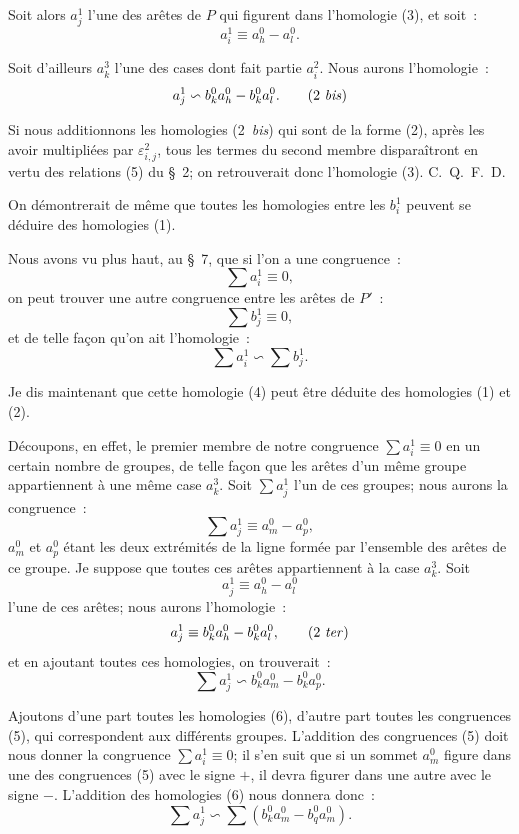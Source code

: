 \documentclass{article}
\begin{document}
Soit alors $a^{1}_{j}$ l'une des arêtes de $P$ qui figurent dans l'homologie (3), et soit~:
\[ a^{1}_{i} \equiv a^{0}_{h} - a^{0}_{l}. \]

Soit d'ailleurs $a^{3}_{k}$ l'une des cases dont fait partie $a^{2}_{i}$. Nous aurons l'homologie~:
\[ a^{1}_{j} \backsim b^{0}_{k} a^{0}_{h} - b^{0}_{k} a^{0}_{l}. \tag{2 \textit{bis}} \]

Si nous additionnons les homologies (2~\emph{bis}) qui sont de la forme (2), après les avoir multipliées par $\varepsilon^{2}_{i,j}$, tous les termes du second membre disparaîtront en vertu des relations (5) du \S~2; on retrouverait donc l'homologie (3). C.~Q.~F.~D.

On démontrerait de même que toutes les homologies entre les $b^{1}_{i}$ peuvent se déduire des homologies (1).

Nous avons vu plus haut, au \S~7, que si l'on a une congruence~:
\[ \sum a^{1}_{i} \equiv 0, \]
on peut trouver une autre congruence entre les arêtes de $P'$~:
\[ \sum b^{1}_{j} \equiv 0, \]
et de telle façon qu'on ait l'homologie~:
\[ \sum a^{1}_{i} \backsim \sum b^{1}_{j}. \tag{4} \]

Je dis maintenant que cette homologie (4) peut être déduite des homologies (1) et (2).

Découpons, en effet, le premier membre de notre congruence $\displaystyle\sum a^{1}_{i} \equiv 0$ en un certain nombre de groupes, de telle façon que les
arêtes d'un même groupe appartiennent à une même case $a^{3}_{k}$. Soit $\displaystyle\sum a^{1}_{j}$ l'un de ces groupes; nous aurons la congruence~:
\[ \sum a^{1}_{j} \equiv a^{0}_{m} - a^{0}_{p}, \tag{5} \]
$a^{0}_{m}$ et $a^{0}_{p}$ étant les deux extrémités de la ligne formée par l'ensemble des arêtes de ce groupe. Je suppose que toutes ces arêtes appartiennent à la case $a^{3}_{k}$. Soit
\[ a^{1}_{j} \equiv a^{0}_{h} - a^{0}_{l} \]
l'une de ces arêtes; nous aurons l'homologie~:
\[ a^{1}_{j} \equiv b^{0}_{k} a^{0}_{h} - b^{0}_{k} a^{0}_{l}, \tag{2 \textit{ter}} \]
et en ajoutant toutes ces homologies, on trouverait~:
\[ \sum a^{1}_{j} \backsim b^{0}_{k} a^{0}_{m} - b^{0}_{k} a^{0}_{p}. \tag{6} \]

Ajoutons d'une part toutes les homologies (6), d'autre part toutes les congruences (5), qui correspondent aux différents groupes. L'addition des congruences (5) doit nous donner la congruence $\displaystyle\sum a^{1}_{i} \equiv 0$; il s'en suit que si un sommet $a^{0}_{m}$ figure dans une des congruences (5) avec le signe $+$, il devra figurer dans une autre avec le signe $-$. L'addition des homologies (6) nous donnera donc~:
\[ \sum a^{1}_{j} \backsim \sum (b^{0}_{k} a^{0}_{m} - b^{0}_{q} a^{0}_{m}). \tag{7} \]
\end{document}
